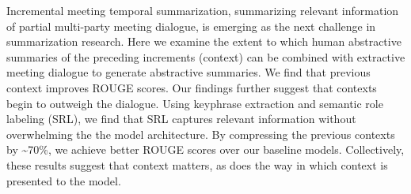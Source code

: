 Incremental meeting temporal summarization, summarizing relevant information of partial multi-party meeting dialogue, is emerging as the next challenge in summarization research. Here we examine the extent to which human abstractive summaries of the preceding increments (context) can be combined with extractive meeting dialogue to generate abstractive summaries. We find that previous context improves ROUGE scores. Our findings further suggest that contexts begin to outweigh the dialogue. Using keyphrase extraction and semantic role labeling (SRL), we find that SRL captures relevant information without overwhelming the the model architecture. By compressing the previous contexts by {\textasciitilde}70\%, we achieve better ROUGE scores over our baseline models. Collectively, these results suggest that context matters, as does the way in which context is presented to the model.

